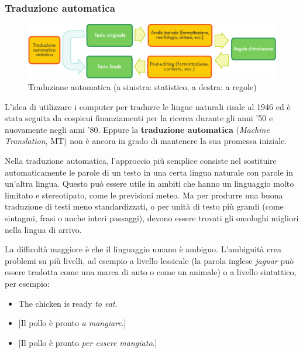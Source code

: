 \begin{multicols}{2}
\subsubsection{Traduzione automatica}


\begin{figure}[htb]
  \center
  \includegraphics[width=\textwidth]{../_media/italian/machine_translation}
  \caption{Traduzione automatica  (a sinistra: statistico, a destra: a regole)}
  \label{fig:mtarch_de}
\end{figure}

L'idea di utilizzare i computer per tradurre le lingue naturali risale al 1946 ed \`{e} stata seguita da cospicui finanziamenti per la ricerca durante gli anni '50 e nuovamente negli anni '80. Eppure la \textbf{traduzione automatica} (\emph{Machine Translation}, MT) non \`{e} ancora in grado di mantenere la sua promessa iniziale.

Nella traduzione automatica, l'approccio pi\`{u} semplice consiste nel
sostituire automaticamente le parole di un testo in una certa lingua
naturale con parole in un'altra lingua. Questo pu\`{o} essere utile in
ambiti che hanno un linguaggio molto limitato e stereotipato, come le
previsioni meteo. Ma per produrre una buona traduzione di testi meno
standardizzati, o per unit\`{a} di testo pi\`{u} grandi (come sintagmi, frasi
o anche interi passaggi), devono essere trovati gli omologhi migliori
nella lingua di arrivo. 


La difficolt\`{a} maggiore \`{e} che il linguaggio umano \`{e} ambiguo. L'ambiguit\`{a} crea problemi su pi\`{u} livelli, ad esempio a livello lessicale (la parola inglese \emph{jaguar} pu\`{o} essere tradotta come una marca di auto o come un animale) o a livello sintattico, per esempio:

\begin{itemize}
\item The chicken is ready \emph{to eat}.
\item {[}Il pollo  \`{e} pronto \emph{a mangiare}.{]}
\item {[}Il pollo  \`{e} pronto \emph{per essere mangiato}.{]}
\end{itemize}


\end{multicols}
